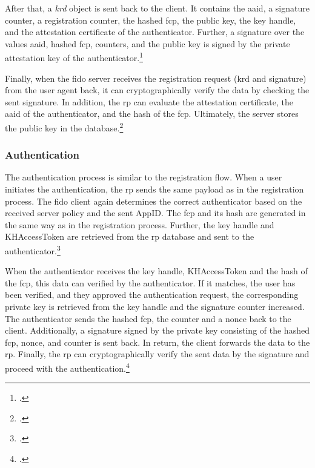  After that, a \textit{\gls{krd}} object is sent back to the client. It contains the \gls{aaid}, a signature counter, a registration counter, the hashed \gls{fcp}, the public key, the key handle, and the attestation certificate of the authenticator. Further, a signature over the values \gls{aaid}, hashed \gls{fcp}, counters, and the public key is signed by the private attestation key of the authenticator.\footcites[See][12--13]{analysis_fido_master_thesis}[See][22]{uaf-protocol}[See][17]{uaf-auth-commands}

Finally, when the \gls{fido} server receives the registration request (\gls{krd} and signature) from the user agent back, it can cryptographically verify the data by checking the sent signature. In addition, the \gls{rp} can evaluate the attestation certificate, the \gls{aaid} of the authenticator, and the hash of the \gls{fcp}. Ultimately, the server stores the public key in the database.\footcites[See][192--193]{7897543}[See][23]{uaf-protocol}

\subsubsection{Authentication}

The authentication process is similar to the registration flow. When a user initiates the authentication, the \gls{rp} sends the same payload as in the registration process. The \gls{fido} client again determines the correct authenticator based on the received server policy and the sent AppID. The \gls{fcp} and its hash are generated in the same way as in the registration process. Further, the key handle and KHAccessToken are retrieved from the \gls{rp} database and sent to the authenticator.\footcites[See][132--133]{10.1007/978-3-319-67639-5_11}

When the authenticator receives the key handle, KHAccessToken and the hash of the \gls{fcp}, this data can verified by the authenticator. If it matches, the user has been verified, and they approved the authentication request, the corresponding private key is retrieved from the key handle and the signature counter increased. The authenticator sends the hashed \gls{fcp}, the counter and a \gls{nonce} back to the client. Additionally, a signature signed by the private key consisting of the hashed \gls{fcp}, nonce, and counter is sent back. In return, the client forwards the data to the \gls{rp}. Finally, the \gls{rp} can cryptographically verify the sent data by the signature and proceed with the authentication.\footcites[See][20--21]{uaf-auth-commands}[See][15]{analysis_fido_master_thesis}

